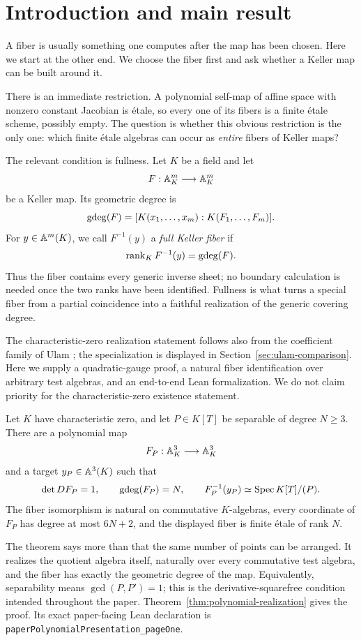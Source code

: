 \section{Introduction and main result}

A fiber is usually something one computes after the map has been chosen.
Here we start at the other end.  We choose the fiber first and ask whether a
Keller map can be built around it.

There is an immediate restriction.  A polynomial self-map of affine space
with nonzero constant Jacobian is \'etale, so every one of its fibers is a
finite \'etale scheme, possibly empty.  The question is whether this obvious
restriction is the only one: which finite \'etale algebras can occur as
\emph{entire} fibers of Keller maps?

The relevant condition is fullness.  Let \(K\) be a field and let
\[
 F:\mathbb A^m_K\longrightarrow\mathbb A^m_K
\]
be a Keller map.  Its geometric degree is
\[
 \operatorname{gdeg}(F)=[K(x_1,\ldots,x_m):K(F_1,\ldots,F_m)].
\]
For \(y\in\mathbb A^m(K)\), we call \(F^{-1}(y)\) a \emph{full Keller fiber} if
\[
 \operatorname{rank}_K F^{-1}(y)=\operatorname{gdeg}(F).
\]
Thus the fiber contains every generic inverse sheet; no boundary calculation
is needed once the two ranks have been identified.  Fullness is what turns a
special fiber from a partial coincidence into a faithful realization of the
generic covering degree.

The characteristic-zero realization statement follows also from the coefficient
family of Ulam \cite[Theorem~5.2]{Ulam}; the specialization is displayed in
Section~\ref{sec:ulam-comparison}. Here we supply a quadratic-gauge proof,
a natural fiber identification over arbitrary test algebras, and an
end-to-end Lean formalization. We do not claim priority for the
characteristic-zero existence statement.

\begin{theorem}
\label{thm:main-intro}
Let \(K\) have characteristic zero, and let \(P\in K[T]\) be separable of
degree \(N\geq3\).  There are a polynomial map
\[
 F_P:\mathbb A^3_K\longrightarrow\mathbb A^3_K
\]
and a target \(y_P\in\mathbb A^3(K)\) such that
\[
 \det DF_P=1,\qquad
 \operatorname{gdeg}(F_P)=N,\qquad
 F_P^{-1}(y_P)\simeq\operatorname{Spec} K[T]/(P).
\]
The fiber isomorphism is natural on commutative \(K\)-algebras, every
coordinate of \(F_P\) has degree at most \(6N+2\), and the displayed fiber is
finite \'etale of rank \(N\).
\end{theorem}

The theorem says more than that the same number of points can be arranged.
It realizes the quotient algebra itself, naturally over every commutative
test algebra, and the fiber has exactly the geometric degree of the map.
Equivalently, separability means \(\gcd(P,P')=1\); this is the
derivative-squarefree condition intended throughout the paper.
Theorem~\ref{thm:polynomial-realization} gives the proof.  Its exact
paper-facing Lean declaration is
\texttt{paperPolynomialPresentation\_pageOne}.

